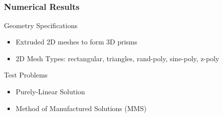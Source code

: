 \documentclass[]{beamer}
\begin{document}
\subsection{}
\begin{frame}[t]\frametitle{Numerical Results}
    	\begin{block}{Geometry Specifications}
		\begin{itemize}
			\item Extruded 2D meshes to form 3D prisms
			\item 2D Mesh Types: rectangular, triangles, rand-poly, sine-poly, z-poly
		\end{itemize}
	\end{block}
	\begin{block}{Test Problems}
		\begin{itemize}
			\item Purely-Linear Solution
			\item Method of Manufactured Solutions (MMS)
		\end{itemize}
	\end{block}
\end{frame}
\end{document}
